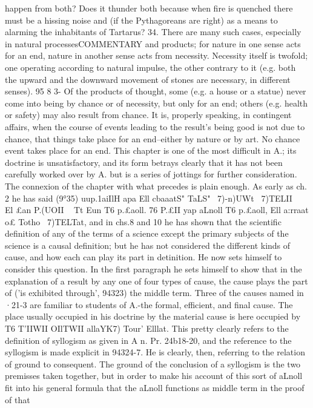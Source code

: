 {{{{{{{{{{{{{{{{{{{{{{{{{{{{{{{{{{{{{{{{{{{{{{{{{{{{{{{{{happen from both? Does it thunder both because when fire is
quenched there must be a hissing noise and (if the Pythagoreans
are right) as a means to alarming the inhabitants of Tartarus?
34. There are many such cases, especially in natural processesCOMMENTARY
and products; for nature in one sense acts for an end, nature in
another sense acts from necessity. Necessity itself is twofold;
one operating according to natural impulse, the other contrary to
it (e.g. both the upward and the downward movement of stones
are necessary, in different senses).
95 8 3- Of the products of thought, some (e.g. a house or a statue)
never come into being by chance or of necessity, but only for
an end; others (e.g. health or safety) may also result from chance.
It is, properly speaking, in contingent affairs, when the course of
events leading to the result's being good is not due to chance,
that things take place for an end--either by nature or by art.
No chance event takes place for an end.
This chapter is one of the most difficult in A.; its doctrine is
unsatisfactory, and its form betrays clearly that it has not been
carefully worked over by A. but is a series of jottings for further
consideration. The connexion of the chapter with what precedes
is plain enough. As early as ch. 2 he has said (9°35) uup.{1aiIlH apa
Ell cbaaatS" TaLS" ~7)-n)UWt ~7)TELII ~ El £an P.(UOII ~ Tt Eun T6 p.£aoll.
76 P.£II yap aLnoll T6 p.£aoll, Ell a:rraat o£ Totho ~7)TELTat, and in
chs.8 and 10 he has shown that the scientific definition of any of
the terms of a science except the primary subjects of the science
is a causal definition; but he has not considered the different
kinds of cause, and how each can play its part in detinition. He
now sets himself to consider this question. In the first paragraph
he sets himself to show that in the explanation of a result by any
one of four types of cause, the cause plays the part of ('is exhibited
through', 94323) the middle term. Three of the causes named in
·21-3 are familiar to students of A.-the formal, efficient, and
final cause. The place usually occupied in his doctrine by the
material cause is here occupied by T6 T'IIWII OIlTWII allaYK7) Tour'
Elllat. This pretty clearly refers to the definition of syllogism as
given in A n. Pr. 24b18-20, and the reference to the syllogism is
made explicit in 94324-7. He is clearly, then, referring to the
relation of ground to consequent. The ground of the conclusion
of a syllogism is the two premisses taken together, but in order to
make his account of this sort of aLnoll fit into his general formula
that the aLnoll functions as middle term in the proof of that
}}}}}}}}}}}}}}}}}}}}}}}}}}}}}}}}}}}}}}}}}}}}}}}}}}}}}}}}}}
